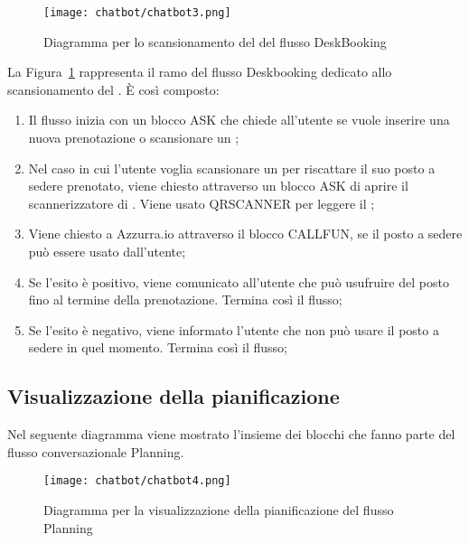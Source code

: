 \begin{figure}[h]
	\centering
	\texttt{[image: chatbot/chatbot3.png]}
	\caption{Diagramma per lo scansionamento del  del flusso DeskBooking}\label{fig:qrcode}
\end{figure}

La Figura~\ref{fig:qrcode} rappresenta il ramo del flusso Deskbooking dedicato allo scansionamento del . È così composto:

\begin{enumerate}
	\item Il flusso inizia con un blocco ASK che chiede all'utente se vuole inserire una nuova prenotazione o scansionare un ;
	\item Nel caso in cui l'utente voglia scansionare un  per riscattare il suo posto a sedere prenotato, viene chiesto attraverso un blocco ASK di aprire il scannerizzatore di . Viene usato QRSCANNER per leggere il ;
	\item Viene chiesto a Azzurra.io attraverso il blocco CALLFUN, se il posto a sedere può essere usato dall'utente;
	\item Se l'esito è positivo, viene comunicato all'utente che può usufruire del posto fino al termine della prenotazione. Termina così il flusso;
	\item Se l'esito è negativo, viene informato l'utente che non può usare il posto a sedere in quel momento. Termina così il flusso;
\end{enumerate}

\subsection{Visualizzazione della pianificazione}
Nel seguente diagramma viene mostrato l'insieme dei blocchi che fanno parte del flusso conversazionale Planning.

\begin{figure}[h]
	\centering
	\texttt{[image: chatbot/chatbot4.png]}
	\caption{Diagramma per la visualizzazione della pianificazione del flusso Planning}\label{fig:plan}
\end{figure}

